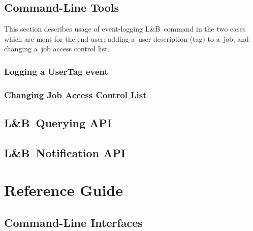 \documentclass{egee}
\def\LB{L\&B}
\def\todo#1{\par\textbf{TODO:} #1\par}
\begin{document}
\subsection{Command-Line Tools}
This section describes usage of event-logging \LB\ command in the two
cases which are ment for the end-user: adding a~user description (tag)
to a~job, and changing a~job access control list.

\subsubsection{Logging a UserTag event}
\label{log_usertag}


\subsubsection{Changing Job Access Control List}
\label{change_acl}





\subsection{\LB\ Querying API}



\subsection{\LB\ Notification API}



\newpage
\section{Reference Guide}


\subsection{Command-Line Interfaces}
\label{cmdln_interface} 



\newpage
\end{document}
